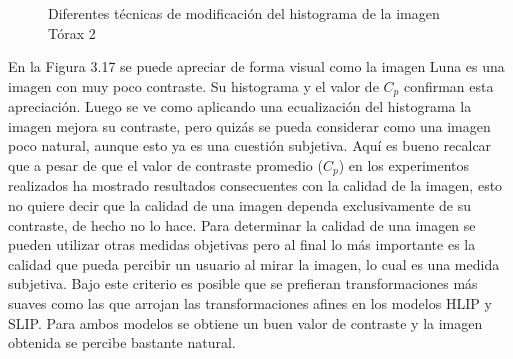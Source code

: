 \begin{figure}
\begin{center}
		\caption{Diferentes t\'ecnicas de modificaci\'on del histograma de la imagen T\'orax 2}
	\end{center}
\end{figure}

En la Figura 3.17 se puede apreciar de forma visual como la imagen Luna es una imagen con muy poco contraste. Su histograma y el valor de $C_p$ confirman esta apreciaci\'on. Luego se ve como aplicando una ecualizaci\'on del histograma la imagen mejora su contraste, pero quiz\'as se pueda considerar como una imagen poco natural, aunque esto ya es una cuesti\'on subjetiva. Aqu\'i es bueno recalcar que a pesar de que el valor de contraste promedio ($C_p$) en los experimentos realizados ha mostrado resultados consecuentes con la calidad de la imagen, esto no quiere decir que la calidad de una imagen dependa exclusivamente de su contraste, de hecho no lo hace. Para determinar la calidad de una imagen se pueden utilizar otras medidas objetivas pero al final lo m\'as importante es la calidad que pueda percibir un usuario al mirar la imagen, lo cual es una medida subjetiva. Bajo este criterio es posible que se prefieran transformaciones m\'as suaves como las que arrojan las transformaciones afines en los modelos HLIP y SLIP. Para ambos modelos se obtiene un buen valor de contraste y la imagen obtenida se percibe bastante natural.

